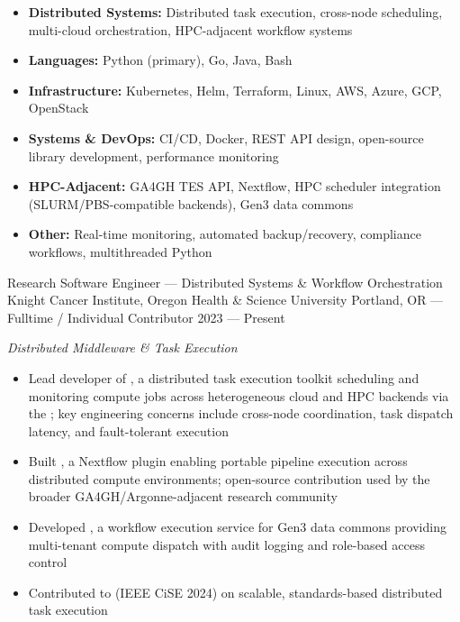 




\begin{itemize}
    \item \textbf{Distributed Systems:} Distributed task execution, cross-node scheduling, multi-cloud orchestration, HPC-adjacent workflow systems
    \item \textbf{Languages:} Python (primary), Go, Java, Bash
    \item \textbf{Infrastructure:} Kubernetes, Helm, Terraform, Linux, AWS, Azure, GCP, OpenStack
    \item \textbf{Systems \& DevOps:} CI/CD, Docker, REST API design, open-source library development, performance monitoring
    \item \textbf{HPC-Adjacent:} GA4GH TES API, Nextflow, HPC scheduler integration (SLURM/PBS-compatible backends), Gen3 data commons
    \item \textbf{Other:} Real-time monitoring, automated backup/recovery, compliance workflows, multithreaded Python
\end{itemize}




\showoff
{Research Software Engineer --- Distributed Systems \& Workflow Orchestration}
{Knight Cancer Institute, Oregon Health \& Science University}
{Portland, OR --- Fulltime / Individual Contributor}
{2023 --- Present}

\emph{Distributed Middleware \& Task Execution}

\begin{itemize}
    \item Lead developer of , a distributed task execution toolkit scheduling and monitoring compute jobs across heterogeneous cloud and HPC backends via the ; key engineering concerns include cross-node coordination, task dispatch latency, and fault-tolerant execution
    \item Built , a Nextflow plugin enabling portable pipeline execution across distributed compute environments; open-source contribution used by the broader GA4GH/Argonne-adjacent research community
    \item Developed , a workflow execution service for Gen3 data commons providing multi-tenant compute dispatch with audit logging and role-based access control
    \item Contributed to  (IEEE CiSE 2024) on scalable, standards-based distributed task execution
\end{itemize}

